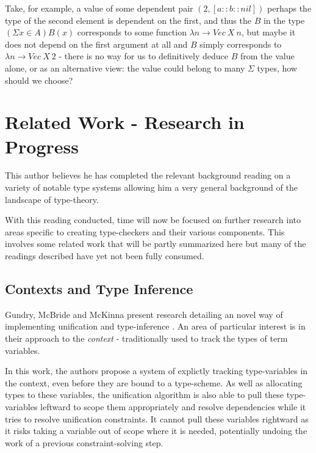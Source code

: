 \documentclass{ProgressReport}[2020/09/15]
\begin{document}
          Take, for example, a value of some dependent pair $(2 , [a :: b
            :: nil])$ perhaps the type of the second element is
          dependent on the first, and thus the $B$ in the type $(
          \Sigma x \in A ) B(x)$ corresponds to some function $\lambda
          n \to Vec \: X \: n$, but maybe it does not depend on the first
          argument at all and $B$ simply corresponds to $\lambda n \to
          Vec \: X \: 2$ - there is no way for us to definitively
          deduce $B$ from the value alone, or as an alternative view:
          the value could belong to many $\Sigma$ types, how should we
          choose?
  
          \section{Related Work - Research in Progress}

          This author believes he has completed the relevant
          background reading on a variety of notable type systems
          allowing him a very general background of the landscape of
          type-theory.

          With this reading conducted, time will now be focused on
          further research into areas specific to creating
          type-checkers and their various components. This involves
          some related work that will be partly summarized here but
          many of the readings described have yet not been fully
          consumed.

          \subsection{Contexts and Type Inference}

          Gundry, McBride and McKinna present research detailing an
          novel way of implementing unification and
          type-inference \cite{TypeInferenceInContext}. An area of
          particular interest is in their approach to the
          \emph{context} - traditionally used to track the types of
          term variables.

          In this work, the authors propose a system of explictly
          tracking type-variables in the context, even before they are
          bound to a type-scheme. As well as allocating types
          to these variables, the unification algorithm is also
          able to pull these type-variables leftward to scope them
          appropriately and resolve dependencies while it tries to
          resolve unification constraints. It cannot pull these
          variables rightward as it risks taking a variable out of
          scope where it is needed, potentially undoing the work of a
          previous constraint-solving step.
\end{document}

